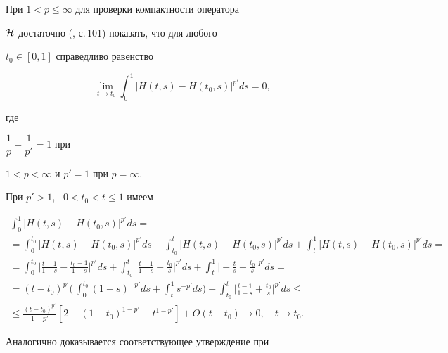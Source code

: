 \begin{pf}


При $1<p\le\infty$ для проверки компактности оператора


${\cal H}$ достаточно (\cite{4}, с.\,101) показать, что для любого


$t_0\in[0,1]$ справедливо равенство


$$


\lim_{t\to t_0}\int_0^1|H(t,s)-H(t_0,s)|^{p'}ds=0,


$$


где


$\dfrac{1}{p}+\dfrac{1}{p'}=1$ при


$1<p<\infty$ и $p'=1$ при $p=\infty$.


При $p'>1$, \ $0< t_0<t\le 1$ имеем


\begin{multline*}


\int_0^1|H(t,s)-H(t_0,s)|^{p'}ds= \\


%


=\int_0^{t_0}|H(t,s)-H(t_0,s)|^{p'}ds+


\int_{t_0}^t|H(t,s)-H(t_0,s)|^{p'}ds+


\int_t^1|H(t,s)-H(t_0,s)|^{p'}ds= \\


%


=\int_0^{t_0}\biggl|\frac{t-1}{1-s}-\frac{t_0-1}{1-s}\biggr|^{p'}ds+


\int_{t_0}^t\biggl|\frac{t-1}{1-s}+\frac{t_0}{s}\biggr|^{p'}ds+


\int_{t}^1\biggl|-\frac{t}{s}+\frac{t_0}{s}\biggr|^{p'}ds= \\


%


=(t-t_0)^{p'}\biggl(\,


\int_{0}^{t_0}(1-s)^{-p'}ds+\int_t^1s^{-p'}ds\biggr)+


\int_{t_0}^t\biggl|\frac{t-1}{1-s}+\frac{t_0}{s}\biggr|^{p'}ds\le \\


%


\le\frac{(t-t_0)^{p'}}{1-p'}[2-(1-t_0)^{1-p'}-


t^{1-p'}]+O(t-t_0)\longrightarrow 0, \quad t\to t_0.


\end{multline*}





Аналогично доказывается соответствующее утверждение при



\end{pf}
